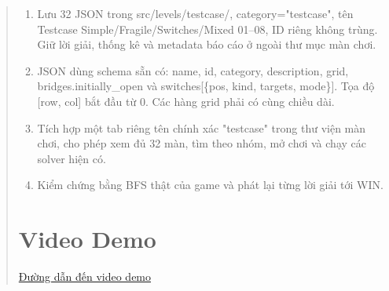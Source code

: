 \begin{quote}
\begin{enumerate}
  \item Lưu 32 JSON trong src/levels/testcase/, category="testcase", tên Testcase Simple/\allowbreak{}Fragile/\allowbreak{}Switches/\allowbreak{}Mixed 01--08, ID riêng không trùng. Giữ lời giải, thống kê và metadata báo cáo ở ngoài thư mục màn chơi.
 
  \item JSON dùng schema sẵn có: name, id, category, description, grid, bridges.\allowbreak{}initially\_\allowbreak{}open và switches[\{pos, kind, targets, mode\}]. Tọa độ [row, col] bắt đầu từ 0. Các hàng grid phải có cùng chiều dài.
 
  \item Tích hợp một tab riêng tên chính xác "testcase" trong thư viện màn chơi, cho phép xem đủ 32 màn, tìm theo nhóm, mở chơi và chạy các solver hiện có.
 
  \item Kiểm chứng bằng BFS thật của game và phát lại từng lời giải tới WIN. 
 
 
 
\end{enumerate}

\section{Video Demo}
\href{https://www.youtube.com/watch?v=KgBhIWJ7A10}{Đường dẫn đến video demo}

\end{quote}


